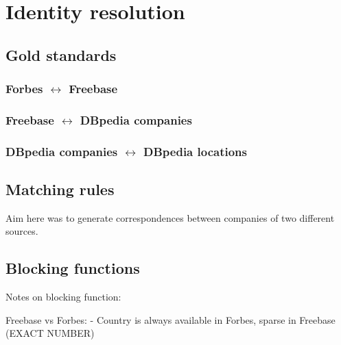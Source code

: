 \section{Identity resolution}
\subsection{Gold standards}

\subsubsection{Forbes $\leftrightarrow$ Freebase}

\subsubsection{Freebase $\leftrightarrow$ DBpedia companies}

\subsubsection{DBpedia companies $\leftrightarrow$ DBpedia locations}


\subsection{Matching rules}
Aim here was to generate correspondences between companies of two different sources. 



\subsection{Blocking functions}

Notes on blocking function:

Freebase vs Forbes: 
- Country is always available in Forbes, sparse in Freebase (EXACT NUMBER)

